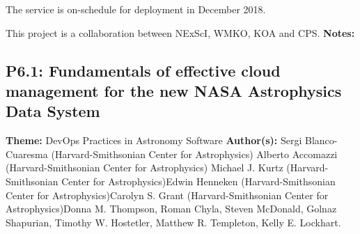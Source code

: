 \documentclass{report}
\begin{document}
{{{{{{{{{{{{{{{{The service is on-schedule for deployment in December 2018.

This project is a collaboration between NExScI, WMKO, KOA and CPS.\newline
{\bf Notes:}\newline
{\newpage
\subsection*{P6.1: Fundamentals of effective cloud management for the new NASA Astrophysics Data System}
{\bf Theme:}  DevOps Practices in Astronomy Software\newline
{\bf Author(s):}\newline
Sergi Blanco-Cuaresma (Harvard-Smithsonian Center for Astrophysics) \newline Alberto Accomazzi (Harvard-Smithsonian Center for Astrophysics) \newline  Michael J. Kurtz (Harvard-Smithsonian Center for Astrophysics)\newline  Edwin Henneken (Harvard-Smithsonian Center for Astrophysics)\newline Carolyn S. Grant (Harvard-Smithsonian Center for Astrophysics)\newline  Donna M. Thompson,
Roman Chyla,
Steven McDonald,
Golnaz Shapurian,
Timothy W. Hostetler,
Matthew R. Templeton,
Kelly E. Lockhart.

}}}}}}}}}}}}}}}}}
\end{document}
